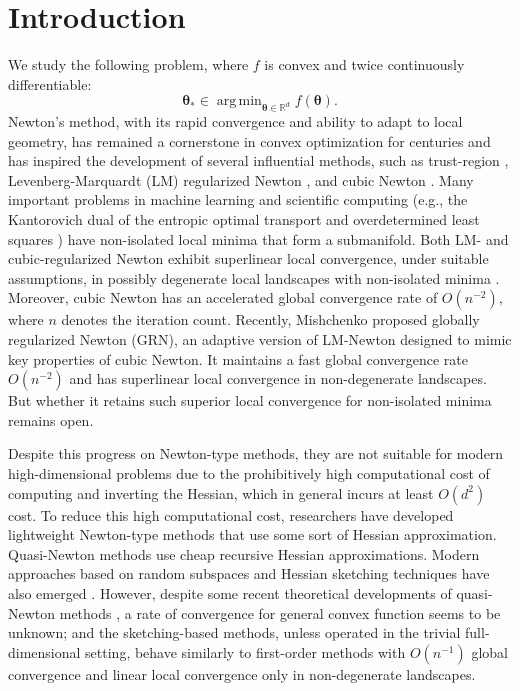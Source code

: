 \documentclass[11pt]{amsart}
\theoremstyle{plain}
\theoremstyle{definition}
\theoremstyle{remark}
\def\R{\mathbb{R}}
\def\param{\boldsymbol{\theta}}
\DeclareMathOperator*{\argmin}{arg\,min}
\begin{document}
\section{Introduction}
We study the following problem, where $f$ is convex and twice continuously differentiable:
\[
\param_{*} \in \argmin_{\param \in \R^d} f(\param).
\]
Newton’s method, with its rapid convergence and ability to adapt to local geometry, has remained a cornerstone in convex optimization for centuries \cite{conn2000trust} and has inspired the development of several influential methods, such as trust-region \cite{conn2000trust,grapiglia2015convergence}, 
 Levenberg-Marquardt (LM) regularized Newton   \cite{levenberg1944method,marquardt1963algorithm}, and cubic Newton \cite{nesterov2006cubic,nesterov2008accelerating}. Many important problems in machine learning and scientific computing (e.g., the Kantorovich dual of the entropic optimal transport \cite{cuturi2013sinkhorn} and overdetermined least squares \cite{gentle2012numerical}) have non-isolated local minima that form a submanifold. Both LM- and cubic-regularized Newton exhibit superlinear local convergence, under suitable assumptions, in possibly degenerate local landscapes with non-isolated minima \cite{yamashita2001rate, fan2005quadratic, li2004regularized, fischer2024levenberg, yue2019quadratic, rebjock2024fast}. Moreover, cubic Newton has an accelerated global convergence rate of $O(n^{-2})$, where $n$ denotes the iteration count. Recently, Mishchenko \cite{mishchenko2023regularized} proposed globally regularized Newton (GRN), an adaptive version of LM-Newton designed to mimic key properties of cubic Newton. It maintains a fast global convergence rate $O(n^{-2})$ and has superlinear local convergence in non-degenerate landscapes. But whether it retains such superior local convergence for non-isolated minima remains open. 

Despite this progress on Newton-type methods, they are not suitable for modern high-dimensional problems due to the prohibitively high computational cost of computing and inverting the Hessian, which in general incurs at least $O(d^{2})$ cost. To reduce this high computational cost, researchers have developed lightweight Newton-type methods that use some sort of Hessian approximation. 
Quasi-Newton methods \cite{broyden1970convergence,fletcher1970new,goldfarb1970family,shanno1970conditioning,liu1989limited} use cheap recursive Hessian approximations. Modern approaches based on random subspaces and Hessian sketching techniques have also emerged \cite{pilanci2017newton,gower2019rsn,jiang2024krylov,hanzely2020stochastic,hanzely2023sketch}.
However, despite some recent theoretical developments of quasi-Newton methods \cite{jin2024non,rodomanov2021rates}, a rate of convergence for general convex function seems to be unknown; and the sketching-based methods, unless operated in the trivial full-dimensional setting, behave similarly to first-order methods with $O(n^{-1})$ global convergence and linear local convergence only in non-degenerate landscapes. 
\end{document}
